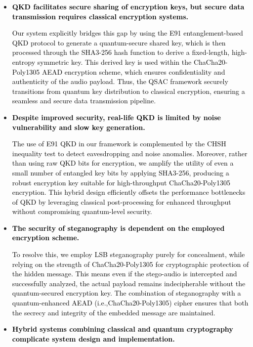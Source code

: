 \documentclass[a4paper]{cas-sc}
\begin{document}
\begin{itemize}
    \item \textcolor{black}{\textbf{QKD facilitates secure sharing of encryption keys, but secure data transmission requires classical encryption systems.}}

          \hspace{15pt}\textcolor{black}{Our system explicitly bridges this gap by using the E91 entanglement-based QKD protocol to generate a quantum-secure shared key, which is then processed through the SHA3-256 hash function to derive a fixed-length, high-entropy symmetric key. This derived key is used within the ChaCha20-Poly1305 AEAD encryption scheme, which ensures confidentiality and authenticity of the audio payload. Thus, the QSAC framework securely transitions from quantum key distribution to classical encryption, ensuring a seamless and secure data transmission pipeline.}
    \item \textcolor{black}{\textbf{Despite improved security, real-life QKD is limited by noise vulnerability and slow key generation.}}

          \hspace{15pt}\textcolor{black}{The use of E91 QKD in our framework is complemented by the CHSH inequality test to detect eavesdropping and noise anomalies. Moreover, rather than using raw QKD bits for encryption, we amplify the utility of even a small number of entangled key bits by applying SHA3-256, producing a robust encryption key suitable for high-throughput ChaCha20-Poly1305 encryption. This hybrid design efficiently offsets the performance bottlenecks of QKD by leveraging classical post-processing for enhanced throughput without compromising quantum-level security.}
    \item \textcolor{black}{\textbf{The security of steganography is dependent on the employed encryption scheme.}}

          \hspace{15pt}\textcolor{black}{To resolve this, we employ LSB steganography purely for concealment, while relying on the strength of ChaCha20-Poly1305 for cryptographic protection of the hidden message. This means even if the stego-audio is intercepted and successfully analyzed, the actual payload remains indecipherable without the quantum-secured encryption key. The combination of steganography with a quantum-enhanced AEAD (i.e.,ChaCha20-Poly1305) cipher ensures that both the secrecy and integrity of the embedded message are maintained.}
    \item \textcolor{black}{\textbf{Hybrid systems combining classical and quantum cryptography complicate system design and implementation.}}


\end{itemize}
\end{document}
